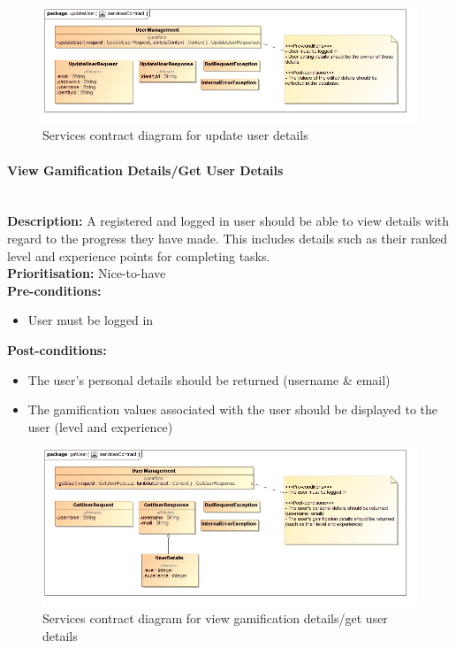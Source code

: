 \documentclass{article}
\begin{document}
\begin{figure}[H]
	\includegraphics[width=\linewidth]{images/ServicesContracts/updateUser.jpg}
	\caption{Services contract diagram for update user details}
\end{figure}

\paragraph{View Gamification Details/Get User Details}\mbox{}\\
\textbf{Description:} A registered and logged in user should be able to view details with regard to the progress they have made. This includes details such as their ranked level and experience points for completing tasks.\\
\textbf{Prioritisation:} Nice-to-have\\		
\textbf{Pre-conditions:}
\begin{itemize}
	\item User must be logged in
\end{itemize}
\textbf{Post-conditions:}
\begin{itemize}
	\item The user's personal details should be returned (username \& email)
	\item The gamification values associated with the user should be displayed to the user (level and experience)
\end{itemize}

\begin{figure}[H]
	\includegraphics[width=\linewidth]{images/ServicesContracts/getUser.jpg}
	\caption{Services contract diagram for view gamification details/get user details}
\end{figure}
\end{document}
